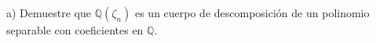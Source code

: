 a) Demuestre que $\mathbb{Q}(\zeta_{n})$ es un cuerpo de descomposición de un polinomio separable con coeficientes en $\mathbb{Q}$.
